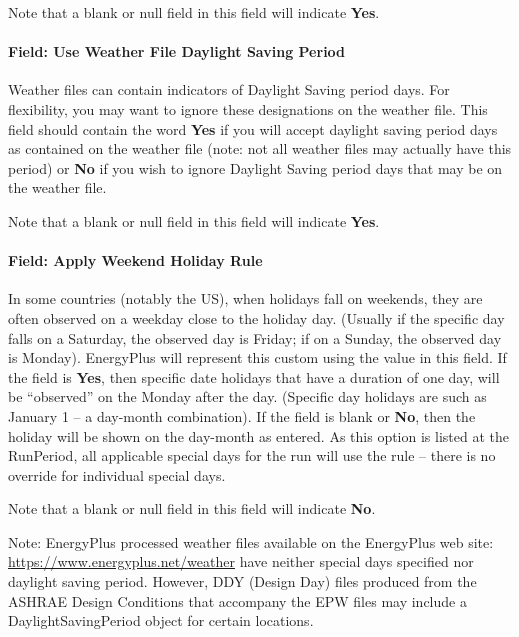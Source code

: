 Note that a blank or null field in this field will indicate \textbf{Yes}.

\paragraph{Field: Use Weather File Daylight Saving Period}\label{field-use-weather-file-daylight-saving-period-3}

Weather files can contain indicators of Daylight Saving period days. For flexibility, you may want to ignore
these designations on the weather file. This field should contain the word \textbf{Yes} if you will accept
daylight saving period days as contained on the weather file (note: not all weather files may actually have
this period) or \textbf{No} if you wish to ignore Daylight Saving period days that may be on the weather file.

Note that a blank or null field in this field will indicate \textbf{Yes}.

\paragraph{Field: Apply Weekend Holiday Rule}\label{field-apply-weekend-holiday-rule-1}

In some countries (notably the US), when holidays fall on weekends, they are often observed on a weekday
close to the holiday day. (Usually if the specific day falls on a Saturday, the observed day is Friday;
if on a Sunday, the observed day is Monday). EnergyPlus will represent this custom using the value in
this field. If the field is \textbf{Yes}, then specific date holidays that have a duration of one day,
will be ``observed'' on the Monday after the day. (Specific day holidays are such as January 1 -- a
day-month combination). If the field is blank or \textbf{No}, then the holiday will be shown on the
day-month as entered. As this option is listed at the RunPeriod, all applicable special days for the run
will use the rule -- there is no override for individual special days.

Note that a blank or null field in this field will indicate \textbf{No}.

\begin{callout}
Note: EnergyPlus processed weather files available on the EnergyPlus web site: \url{https://www.energyplus.net/weather}
have neither special days specified nor daylight saving period. However, DDY (Design Day) files produced
from the ASHRAE Design Conditions that accompany the EPW files may include a DaylightSavingPeriod object
for certain locations.
\end{callout}

